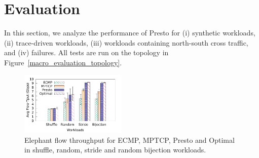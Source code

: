 \section{Evaluation}
\label{sec:eval}

In this section, we analyze the performance of Presto for (i) synthetic workloads, (ii)
trace-driven workloads, (iii) workloads containing north-south cross traffic, and (iv) failures.
All tests are run on the topology in Figure~\ref{macro_evaluation_topology}.
\begin{figure}[!t]
        \centering
  \includegraphics[width=0.45\textwidth]{presto/figures/macro/stride/macro_compare_tput_witherrbar.pdf}
        \caption{Elephant flow throughput for ECMP, MPTCP, Presto and Optimal in shuffle, random, stride and random bijection workloads.}
        \label{macro_evaluation_tput}
\end{figure}



